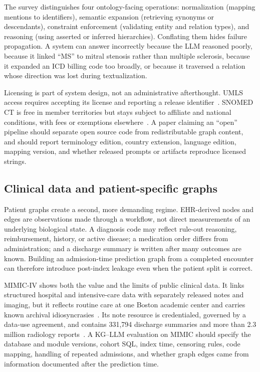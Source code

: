 The survey distinguishes four ontology-facing operations: normalization (mapping mentions to identifiers), semantic expansion (retrieving synonyms or descendants), constraint enforcement (validating entity and relation types), and reasoning (using asserted or inferred hierarchies). Conflating them hides failure propagation. A system can answer incorrectly because the LLM reasoned poorly, because it linked ``MS'' to mitral stenosis rather than multiple sclerosis, because it expanded an ICD billing code too broadly, or because it traversed a relation whose direction was lost during textualization.

Licensing is part of system design, not an administrative afterthought. UMLS access requires accepting its license and reporting a release identifier~\cite{nlmumlsarchive}. SNOMED CT is free in member territories but stays subject to affiliate and national conditions, with fees or exemptions elsewhere~\cite{snomedget}. A paper claiming an ``open'' pipeline should separate open source code from redistributable graph content, and should report terminology edition, country extension, language edition, mapping version, and whether released prompts or artifacts reproduce licensed strings.

\subsection{Clinical data and patient-specific graphs}

Patient graphs create a second, more demanding regime. EHR-derived nodes and edges are observations made through a workflow, not direct measurements of an underlying biological state. A diagnosis code may reflect rule-out reasoning, reimbursement, history, or active disease; a medication order differs from administration; and a discharge summary is written after many outcomes are known. Building an admission-time prediction graph from a completed encounter can therefore introduce post-index leakage even when the patient split is correct.

MIMIC-IV shows both the value and the limits of public clinical data. It links structured hospital and intensive-care data with separately released notes and imaging, but it reflects routine care at one Boston academic center and carries known archival idiosyncrasies~\cite{johnson2023mimicdata}. Its note resource is credentialed, governed by a data-use agreement, and contains 331{,}794 discharge summaries and more than 2.3 million radiology reports~\cite{johnson2023mimicnote}. A KG--LLM evaluation on MIMIC should specify the database and module versions, cohort SQL, index time, censoring rules, code mapping, handling of repeated admissions, and whether graph edges came from information documented after the prediction time.


